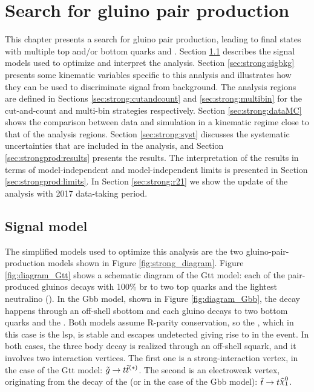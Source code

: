 \chapter{Search for gluino pair production}
\label{chap:strong_prod}

This chapter presents a search for gluino pair production, leading to final states with multiple top and/or bottom quarks and \met. 
Section \ref{sec:strong:signalmodel} describes the signal models used to optimize and interpret the analysis. 
Section \ref{sec:strong:sigbkg} presents some kinematic variables specific to this analysis and illustrates how they can be used to 
discriminate signal from background. 
The analysis regions are defined in Sections \ref{sec:strong:cutandcount} and \ref{sec:strong:multibin} for the cut-and-count and multi-bin strategies respectively. 
Section \ref{sec:strong:dataMC} shows the comparison between data and simulation in a kinematic regime close to that of the analysis regions. 
Section \ref{sec:strong:syst} discusses the systematic uncertainties that are included in the analysis, and Section \ref{sec:strongprod:results} 
presents the results. 
The interpretation of the results in terms of model-independent and model-independent limits is presented in Section \ref{sec:strongprod:limits}. 
In Section \ref{sec:strong:r21} we show the update of the analysis with 2017 data-taking period.

\section{Signal model}
\label{sec:strong:signalmodel}

The simplified models used to optimize this analysis are the two gluino-pair-production models shown in Figure \ref{fig:strong_diagram}. 
Figure \ref{fig:diagram_Gtt} shows a schematic diagram of the Gtt model: 
each of the pair-produced gluinos decays with 100\% \gls{br} to two top quarks and the lightest neutralino (\ninoone).
In the Gbb model, shown in Figure \ref{fig:diagram_Gbb}, the decay happens through an off-shell sbottom and each gluino decays to 
two bottom quarks and the \ninoone. Both models assume R-parity conservation, so the \ninoone, which in this case is the \gls{lsp}, is stable 
and escapes undetected giving rise to \met in the event. In both cases, the three body decay is realized through an off-shell squark, 
and it involves two interaction vertices. The first one is a strong-interaction vertex, in the case of the Gtt model:
$\tilde{g} \to t \tilde{t}^{(*)}$.
The second is an electroweak vertex, originating from the decay of the \stop (or \sbottom in the case of the Gbb model):
$\stop \to t \ninoone$.

